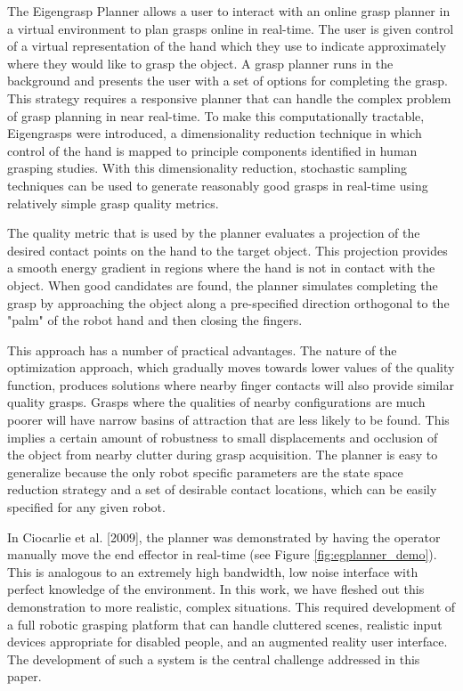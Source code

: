 The Eigengrasp Planner allows a user to interact with an online grasp planner in a virtual environment to plan grasps online in real-time. The user is given control of a virtual representation of the hand which they use to indicate approximately where they would like to grasp the object. A grasp planner runs in the background and presents the user with a set of options for completing the grasp. 
This strategy requires a responsive planner that can handle the complex problem of grasp planning in near real-time. To make this computationally tractable, Eigengrasps were introduced, a dimensionality reduction technique in which control of the hand is mapped to principle components identified in human grasping studies. With this dimensionality reduction, stochastic sampling techniques can be used to generate reasonably good grasps in real-time using relatively simple grasp quality metrics.
 
The quality metric that is used by the planner evaluates a projection of the desired contact points on the hand to the target object. This projection provides a smooth energy gradient in regions where the hand is not in contact with the object. When good candidates are found, the planner simulates completing the grasp by approaching the object along a pre-specified direction orthogonal to the "palm" of the robot hand and then closing the fingers. 

This approach has a number of practical advantages. The nature of the optimization approach, which gradually moves towards lower values of the quality function, produces solutions where nearby finger contacts will also provide similar quality grasps. Grasps where the qualities of nearby configurations are much poorer will have narrow basins of attraction that are less likely to be found. This implies a certain amount of robustness to small displacements and occlusion of the object from nearby clutter during grasp acquisition. The planner is easy to generalize because the only robot specific parameters are the state space reduction strategy and a set of desirable contact locations, which can be easily specified for any given robot. 

In Ciocarlie et al. [2009], the planner was demonstrated by having the operator manually move the end effector in real-time (see Figure \ref{fig:egplanner_demo}). This is analogous to an extremely high bandwidth, low noise interface with perfect knowledge of the environment. In this work, we have fleshed out this demonstration to more realistic, complex situations. This required development of a full robotic grasping platform that can handle cluttered scenes, realistic input devices appropriate for disabled people, and an augmented reality user interface. The development of such a system is the central challenge addressed in this paper.  


